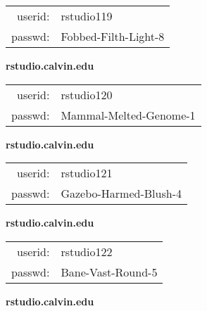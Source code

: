 \documentclass{article}\usepackage[]{graphicx}\usepackage[]{color}
\begin{document}
\begin{multicols}{3}
\begin{minipage}{.3\textwidth}
\begin{tabular}{rl}
userid: & rstudio119\\
passwd: & Fobbed-Filth-Light-8

\vspace{5mm}

\end{tabular}\end{minipage}

\vspace{5mm}

\begin{minipage}{.3\textwidth}
\centerline{\textbf{rstudio.calvin.edu}}
\medskip
\begin{tabular}{rl}

userid: & rstudio120\\
passwd: & Mammal-Melted-Genome-1

\vspace{5mm}

\end{tabular}\end{minipage}

\vspace{5mm}

\begin{minipage}{.3\textwidth}
\centerline{\textbf{rstudio.calvin.edu}}
\medskip
\begin{tabular}{rl}

userid: & rstudio121\\
passwd: & Gazebo-Harmed-Blush-4

\vspace{5mm}

\end{tabular}\end{minipage}

\vspace{5mm}

\begin{minipage}{.3\textwidth}
\centerline{\textbf{rstudio.calvin.edu}}
\medskip
\begin{tabular}{rl}

userid: & rstudio122\\
passwd: & Bane-Vast-Round-5

\vspace{5mm}

\end{tabular}\end{minipage}

\vspace{5mm}

\begin{minipage}{.3\textwidth}
\centerline{\textbf{rstudio.calvin.edu}}
\medskip
\begin{tabular}{rl}


\end{tabular}
\end{minipage}
\end{multicols}
\end{document}
